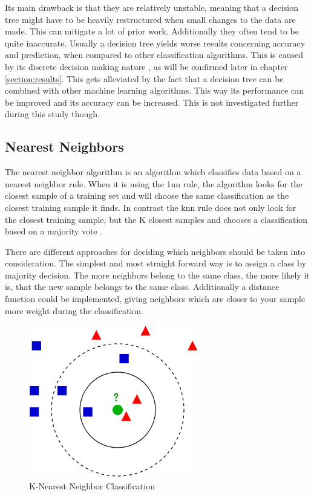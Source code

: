 Its main drawback is that they are relatively unstable, meaning that a decision tree might have to be heavily restructured when small changes to the data are made. This can mitigate a lot of prior work. Additionally they often tend to be quite inaccurate. Usually a decision tree yields worse results concerning accuracy and prediction, when compared to other classification algorithms. This is caused by its discrete decision making nature \autocite[]{king1995statlog, gascuel1998twelve}, as will be confirmed later in chapter \ref{section:results}. This gets alleviated by the fact that a decision tree can be combined with other machine learning algorithms. This way its performance can be improved and its accuracy can be increased. This is not investigated further during this study though.


\subsection{Nearest Neighbors}
The nearest neighbor algorithm is an algorithm which classifies data based on a nearest neighbor rule. When it is using the \gls{1nn} rule, the algorithm looks for the closest sample of a training set and will choose the same classification as the closest training sample it finds. In contrast the \gls{knn} rule does not only look for the closest training sample, but the K closest samples and chooses a classification based on a majority vote \autocite[]{cover1967nearest}.

There are different approaches for deciding which neighbors should be taken into consideration. The simplest and most straight forward way is to assign a class by majority decision. The more neighbors belong to the same class, the more likely it is, that the new sample belongs to the same class. Additionally a distance function could be implemented, giving neighbors which are closer to your sample more weight during the classification.

\begin{figure}[!ht]
    \centering
    \includegraphics[width=0.5\linewidth]{images/Classification-Knn.png}
    \caption[]{
        K-Nearest Neighbor Classification \autocite[]{image-knn}
    }
    \label{figure:knn}
\end{figure}

